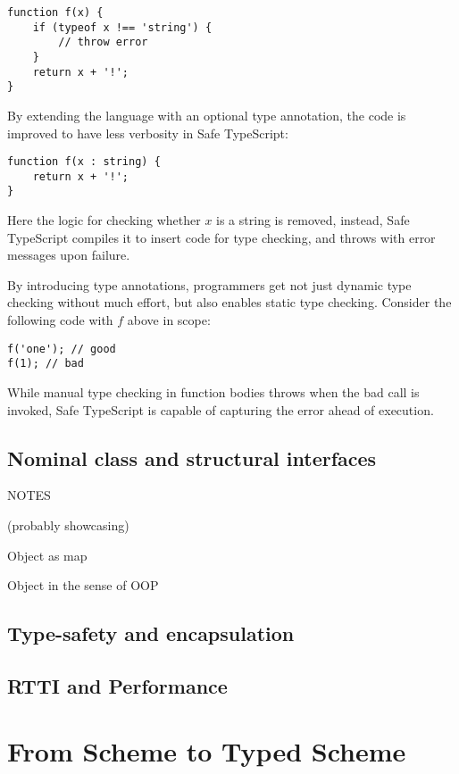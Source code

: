 \begin{verbatim}
function f(x) {
    if (typeof x !== 'string') {
        // throw error
    }
    return x + '!';
}
\end{verbatim}

By extending the language with an optional type annotation,
the code is improved to have less verbosity in Safe TypeScript: 

\begin{verbatim}
function f(x : string) {
    return x + '!';
}
\end{verbatim}

Here the logic for checking whether $x$ is a string is removed,
instead, Safe TypeScript compiles it to insert code for type checking,
and throws with error messages upon failure.

By introducing type annotations, programmers get not just dynamic type checking without
much effort, but also enables static type checking. Consider the following code with $f$
above in scope:

\begin{verbatim}
f('one'); // good
f(1); // bad
\end{verbatim}

While manual type checking in function bodies throws when the bad call is invoked,
Safe TypeScript is capable of capturing the error ahead of execution.

\subsection{Nominal class and structural interfaces}

NOTES

(probably showcasing)

Object as map

Object in the sense of OOP

\subsection{Type-safety and encapsulation}

\subsection{RTTI and Performance}


\section{From Scheme to Typed Scheme}



